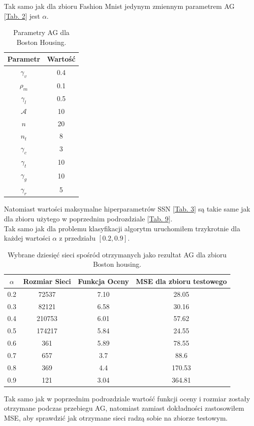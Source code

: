 \documentclass{article}
\begin{document}
Tak samo jak dla zbioru Fashion Mnist jedynym zmiennym parametrem AG 
[\hyperref[tab:params]{Tab. 2}] jest $\alpha$.
\begin{table}[H]
\centering
\begin{tabular}{|c|c|}
	\hline
	Parametr & Wartość\\
	\hline
	 $\gamma_v$ &0.4\\
	 $\rho_m$ &0.1\\
	 $\gamma_l$& 0.5\\
	 $\mathcal{A}$ &10\\
	 $n$  &20\\
	 $n_t$  &8\\
	 $\gamma_c$  &3\\
	 $\gamma_t$ &10\\
	 $\gamma_g$ &10\\
	 $\gamma_r$ &5\\
	\hline
\end{tabular}
\caption{\label{tab:bh_params}Parametry AG dla Boston Housing.}
\end{table}
Natomiast wartości maksymalne hiperparametrów SSN [\hyperref[tab:zakres]{Tab. 3}] są takie
same jak dla zbioru użytego w poprzednim podrozdziale 
[\hyperref[tab:fm_zakres]{Tab. 9}].\\
Tak samo jak dla problemu klasyfikacji algorytm uruchomiłem trzykrotnie 
dla każdej wartości $\alpha$ z przedziału $[0.2, 0.9]$.
\begin{table}[H]
\centering
\begin{tabular}{|c|c|c|c|}
        \hline
	$\alpha$ & Rozmiar Sieci & Funkcja Oceny & MSE dla zbioru testowego\\
	\hline
	0.2 & 72537 & 7.10 &  28.05 \\
	0.3 & 82121 & 6.58 & 30.16\\
	0.4 & 210753 & 6.01 & 57.62\\
	0.5 & 174217 & 5.84 &  24.55\\
	0.6 & 361 & 5.89 & 78.55 \\
	0.7 & 657 & 3.7 & 88.6 \\
	0.8 & 369 &  4.4 & 170.53\\
	0.9 & 121 & 3.04 & 364.81\\
	\hline
\end{tabular}
\caption{\label{tab:bhres}Wybrane dziesięć sieci spośród otrzymanych jako rezultat AG dla zbioru Boston housing.}
\end{table}
Tak samo jak w poprzednim podrozdziale wartość funkcji oceny i rozmiar zostały otrzymane podczas 
przebiegu AG, natomiast zamiast dokładności zastosowiłem MSE, aby sprawdzić jak otrzymane
sieci radzą sobie na zbiorze testowym.
\end{document}
